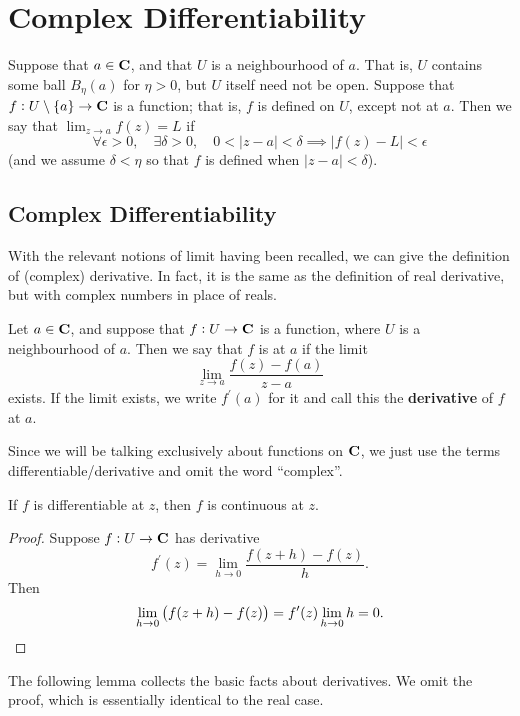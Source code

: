 \section{Complex Differentiability}
Suppose that $a\in\mathbf C$, and that $U$ is a neighbourhood of $a$. That is, $U$ contains some ball $B_\eta(a)$ for $\eta>0$, but $U$ itself need not be open. Suppose that $f:U\setminus\{a\}\to\mathbf C$ is a function; that is, $f$ is defined on $U$, except not at $a$. Then we say that $\displaystyle\lim_{z\to a}f(z)=L$ if
\[\forall\epsilon>0,\quad\exists\delta>0,\quad 0<|z-a|<\delta\implies|f(z)-L|<\epsilon\]
(and we assume $\delta<\eta$ so that $f$ is defined when $|z-a|<\delta$).

\subsection{Complex Differentiability}
With the relevant notions of limit having been recalled, we can give the definition of (complex) derivative. In fact, it is the same as the definition of real derivative, but with complex numbers in place of reals.

\begin{definition}
Let $a\in\mathbf C$, and suppose that $f:U\to\mathbf C$ is a function, where $U$ is a neighbourhood of $a$. Then we say that $f$ is  at $a$ if the limit
\[\lim_{z\to a}\frac{f(z)-f(a)}{z-a}\]
exists. If the limit exists, we write $f^\prime(a)$ for it and call this the \textbf{derivative} of $f$ at $a$.
\end{definition}

Since we will be talking exclusively about functions on $\mathbf C$, we just use the terms differentiable/derivative and omit the word ``complex''.

\begin{proposition}
If $f$ is differentiable at $z$, then $f$ is continuous at $z$.
\end{proposition}

\begin{proof}
Suppose $f:U\to\mathbf C$ has derivative 
\[f^\prime(z)=\lim_{h\to0}\frac{f(z+h)-f(z)}{h}.\]
Then
\[\lim_{h\to0}\left(f(z+h)-f(z)\right)=f^\prime(z)\lim_{h\to0}h=0.\]
\end{proof}

The following lemma collects the basic facts about derivatives. We omit the proof, which is essentially identical to the real case.

